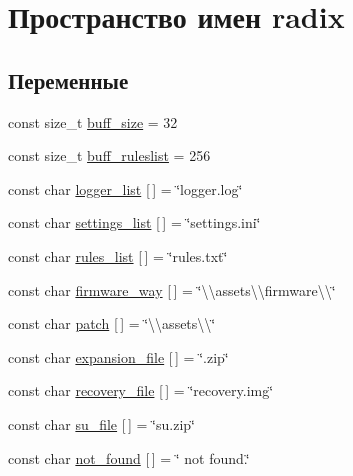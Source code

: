 \hypertarget{namespaceradix}{}\section{Пространство имен radix}
\label{namespaceradix}
\subsection*{Переменные}
\begin{DoxyCompactItemize}
\item 
const size\+\_\+t \hyperlink{namespaceradix_a82e81e89088b6430b7ec11a8a0329e9c}{buff\+\_\+size} = 32
\item 
const size\+\_\+t \hyperlink{namespaceradix_a8f000aabf647d34fd877c33958bad711}{buff\+\_\+ruleslist} = 256
\item 
const char \hyperlink{namespaceradix_a11c5bfe5c65a0f88a2a950111c6ffc09}{logger\+\_\+list} \mbox{[}$\,$\mbox{]} = \char`\"{}logger.\+log\char`\"{}
\item 
const char \hyperlink{namespaceradix_a43bff57dbd1b7dcebee0228ccbab7f17}{settings\+\_\+list} \mbox{[}$\,$\mbox{]} = \char`\"{}settings.\+ini\char`\"{}
\item 
const char \hyperlink{namespaceradix_a73b088a3e903cc2845c2299b9ab8ccaf}{rules\+\_\+list} \mbox{[}$\,$\mbox{]} = \char`\"{}rules.\+txt\char`\"{}
\item 
const char \hyperlink{namespaceradix_a123392a7ece6e11efaf3ad3df291ff3d}{firmware\+\_\+way} \mbox{[}$\,$\mbox{]} = \char`\"{}\textbackslash{}\textbackslash{}assets\textbackslash{}\textbackslash{}firmware\textbackslash{}\textbackslash{}\char`\"{}
\item 
const char \hyperlink{namespaceradix_aa90f63f1d0143b58469670ccbb86cfc4}{patch} \mbox{[}$\,$\mbox{]} = \char`\"{}\textbackslash{}\textbackslash{}assets\textbackslash{}\textbackslash{}\char`\"{}
\item 
const char \hyperlink{namespaceradix_a01a09f0b88f6fd375ea20667bd318035}{expansion\+\_\+file} \mbox{[}$\,$\mbox{]} = \char`\"{}.zip\char`\"{}
\item 
const char \hyperlink{namespaceradix_a91c21d6be385236a564ef5bf1f3f3602}{recovery\+\_\+file} \mbox{[}$\,$\mbox{]} = \char`\"{}recovery.\+img\char`\"{}
\item 
const char \hyperlink{namespaceradix_abcd4cb3ab01a6a642ba224e2d9b1eda5}{su\+\_\+file} \mbox{[}$\,$\mbox{]} = \char`\"{}su.\+zip\char`\"{}
\item 
const char \hyperlink{namespaceradix_a9f0187ab8d7f9931ed08159a233408c0}{not\+\_\+found} \mbox{[}$\,$\mbox{]} = \char`\"{} not found.\char`\"{}

\end{DoxyCompactItemize}
